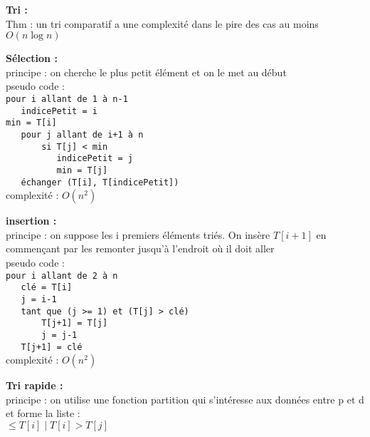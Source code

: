 \documentclass[8pt,a4paper]{extarticle}
\begin{document}
\begin{multicols}{3}
      \textbf{Tri :}\\
      Thm : un tri comparatif a une complexité dans le pire des cas au moins \(O(n \log n)\)

      \bigskip

      \columnbreak

      \textbf{Sélection :}\\
      principe : on cherche le plus petit élément et on le met au début\\

      pseudo code :\\
      \verb|pour i allant de 1 à n-1|\\
      \verb|   indicePetit = i|\\
      \verb|min = T[i]|\\
      \verb|   pour j allant de i+1 à n|\\
      \verb|       si T[j] < min|\\
      \verb|          indicePetit = j|\\
      \verb|          min = T[j]|\\
      \verb|   échanger (T[i], T[indicePetit])|\\
      complexité : \(O(n^2)\)

      \bigskip

      \textbf{insertion :}\\
      principe : on suppose les i premiers éléments triés. On insère \(T[i+1]\) en commençant par les remonter jusqu’à l’endroit où il doit aller\\

      pseudo code :\\
      \verb|pour i allant de 2 à n|\\
      \verb|   clé = T[i]|\\
      \verb|   j = i-1|\\
      \verb|   tant que (j >= 1) et (T[j] > clé)|\\
      \verb|       T[j+1] = T[j]|\\
      \verb|       j = j-1|\\
      \verb|   T[j+1] = clé|\\
      complexité : \(O(n^2)\)

      \bigskip

      \textbf{Tri rapide :}\\
      principe : on utilise une fonction partition qui s’intéresse aux données entre p et d et forme la liste :\\
      \(\leq T[i] \mid T[i] > T[j]\)


\end{multicols}
\end{document}
